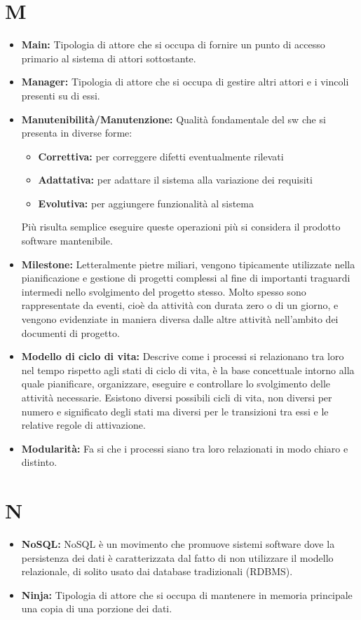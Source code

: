 \documentclass[a4paper]{article}
\begin{document}
	\section{M}
		\begin{itemize}
			\item \textbf{Main:} Tipologia di attore che si occupa di fornire un punto di accesso primario al sistema di attori sottostante.
			\item \textbf{Manager:} Tipologia di attore che si occupa di gestire altri attori e i vincoli presenti su di essi.
			\item \textbf{Manutenibilità/Manutenzione:} Qualità fondamentale del sw che si presenta in diverse forme:
			\begin{itemize}
				\item  \textbf{Correttiva:} per correggere difetti eventualmente rilevati
			  	\item  \textbf{Adattativa:} per adattare il sistema alla variazione dei requisiti
			  	\item  \textbf{Evolutiva:} per aggiungere funzionalità al sistema
			\end{itemize}
			Più risulta semplice eseguire queste operazioni più si considera il prodotto software mantenibile.
			\item \textbf{Milestone:} Letteralmente pietre miliari, vengono tipicamente utilizzate nella pianificazione 
			e gestione di progetti complessi al fine di importanti traguardi intermedi nello svolgimento del progetto stesso. 
			Molto spesso sono rappresentate da eventi, cioè da attività con durata zero o di un giorno, e vengono evidenziate 
			in maniera diversa dalle altre attività nell’ambito dei documenti di progetto.
			\item \textbf{Modello di ciclo di vita:} Descrive come i processi si relazionano tra loro nel tempo rispetto agli 
			stati di ciclo di vita, è la base concettuale intorno alla quale pianificare, organizzare, eseguire e controllare 
			lo svolgimento delle attività necessarie. Esistono diversi possibili cicli di vita, non diversi per numero e significato 
			degli stati ma diversi per le transizioni tra essi e le relative regole di attivazione.
			\item \textbf{Modularità:} Fa si che i processi siano tra loro relazionati in modo chiaro e distinto.		
		\end{itemize}
		
	\section{N}
	\begin{itemize}
		\item \textbf{NoSQL:} NoSQL è un movimento che promuove sistemi software dove la persistenza dei dati è caratterizzata dal fatto di non utilizzare il modello relazionale, di solito usato dai database tradizionali (RDBMS).
		\item \textbf{Ninja:} Tipologia di attore che si occupa di mantenere in memoria principale una copia di una porzione dei dati.
	\end{itemize}
		
\end{document}
